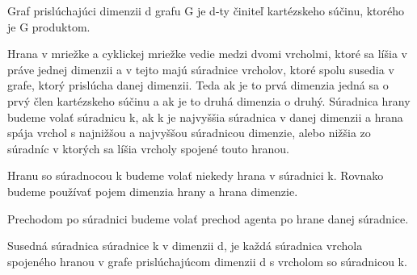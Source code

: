 \begin{ozn}
Graf prislúchajúci dimenzii d grafu G je d-ty činiteľ kartézskeho súčinu, ktorého
je G produktom.
\end{ozn}

\begin{ozn}
Hrana v mriežke a cyklickej mriežke vedie medzi dvomi vrcholmi, 
ktoré sa líšia v práve jednej dimenzii a v tejto majú súradnice vrcholov,
ktoré spolu susedia v grafe, ktorý prislúcha danej dimenzii. Teda ak je to
prvá dimenzia jedná sa o prvý člen kartézskeho súčinu a ak je to druhá
dimenzia o druhý. Súradnica hrany budeme volať súradnicu k, ak k je
najvyššia súradnica v danej dimenzii a hrana spája vrchol s najnižšou a
najvyššou súradnicou dimenzie, alebo nižšia zo súradníc v ktorých sa líšia
vrcholy spojené touto hranou.

Hranu so súradnocou k budeme volať niekedy hrana v súradnici k. Rovnako
budeme používať pojem dimenzia hrany a hrana dimenzie.
\end{ozn}
\begin{ozn}
Prechodom po súradnici budeme volať prechod agenta po hrane danej súradnice.
\end{ozn}

\begin{ozn}
Susedná súradnica súradnice k v dimenzii d, je každá súradnica vrchola
spojeného hranou v grafe prislúchajúcom dimenzii d s vrcholom so súradnicou
k.
\end{ozn}



